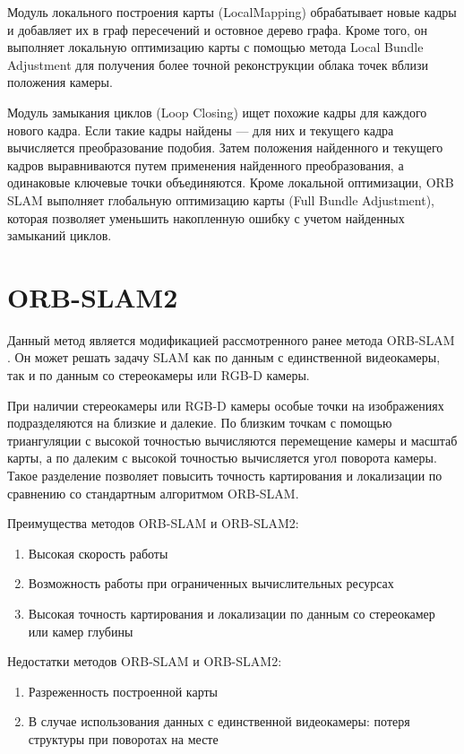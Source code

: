 \documentclass{mipt-thesis-bs}
\begin{document}
Модуль локального построения карты (LocalMapping) обрабатывает новые кадры и добавляет их в граф пересечений и остовное дерево графа. Кроме того, он выполняет локальную оптимизацию карты с помощью метода Local Bundle Adjustment для получения более точной реконструкции облака точек вблизи положения камеры.

Модуль замыкания циклов (Loop Closing) ищет похожие кадры для каждого нового кадра. Если такие кадры найдены — для них и текущего кадра вычисляется преобразование подобия. Затем положения найденного и текущего кадров выравниваются путем применения найденного преобразования, а одинаковые ключевые точки объединяются. Кроме локальной оптимизации, ORB SLAM выполняет глобальную оптимизацию карты (Full Bundle Adjustment), которая позволяет уменьшить накопленную ошибку с учетом найденных замыканий циклов.

\section{ORB-SLAM2}
Данный метод является модификацией рассмотренного ранее метода ORB-SLAM \cite{mur2015orb}. Он может решать задачу SLAM как по данным с единственной видеокамеры, так и по данным со стереокамеры или RGB-D камеры.

При наличии стереокамеры или RGB-D камеры особые точки на изображениях подразделяются на близкие и далекие. По близким точкам с помощью триангуляции с высокой точностью вычисляются перемещение камеры и масштаб карты, а по далеким с высокой точностью вычисляется угол поворота камеры. Такое разделение позволяет повысить точность картирования и локализации по сравнению со стандартным алгоритмом ORB-SLAM.

Преимущества методов ORB-SLAM и ORB-SLAM2:
\begin{enumerate}
	\item {Высокая скорость работы}
	\item {Возможность работы при ограниченных вычислительных ресурсах}
	\item {Высокая точность картирования и локализации по данным со стереокамер или камер глубины}
\end{enumerate}
Недостатки методов ORB-SLAM и ORB-SLAM2:
\begin{enumerate}
	\item {Разреженность построенной карты}
	\item {В случае использования данных с единственной видеокамеры: потеря структуры при поворотах на месте}
\end{enumerate}
\end{document}

